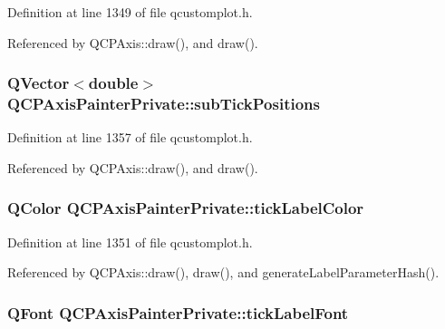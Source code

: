 Definition at line 1349 of file qcustomplot.\+h.



Referenced by Q\+C\+P\+Axis\+::draw(), and draw().

\hypertarget{class_q_c_p_axis_painter_private_afcde7484bbcc1004b8f59ab984ada6f9}{}
\subsubsection[{sub\+Tick\+Positions}]{\setlength{\rightskip}{0pt plus 5cm}Q\+Vector$<$double$>$ Q\+C\+P\+Axis\+Painter\+Private\+::sub\+Tick\+Positions}\label{class_q_c_p_axis_painter_private_afcde7484bbcc1004b8f59ab984ada6f9}


Definition at line 1357 of file qcustomplot.\+h.



Referenced by Q\+C\+P\+Axis\+::draw(), and draw().

\hypertarget{class_q_c_p_axis_painter_private_a88032cf15c997e3956b79617b859e8ad}{}
\subsubsection[{tick\+Label\+Color}]{\setlength{\rightskip}{0pt plus 5cm}Q\+Color Q\+C\+P\+Axis\+Painter\+Private\+::tick\+Label\+Color}\label{class_q_c_p_axis_painter_private_a88032cf15c997e3956b79617b859e8ad}


Definition at line 1351 of file qcustomplot.\+h.



Referenced by Q\+C\+P\+Axis\+::draw(), draw(), and generate\+Label\+Parameter\+Hash().

\hypertarget{class_q_c_p_axis_painter_private_a06cb4b185feb1e560e01d65887e4d80d}{}
\subsubsection[{tick\+Label\+Font}]{\setlength{\rightskip}{0pt plus 5cm}Q\+Font Q\+C\+P\+Axis\+Painter\+Private\+::tick\+Label\+Font}\label{class_q_c_p_axis_painter_private_a06cb4b185feb1e560e01d65887e4d80d}


